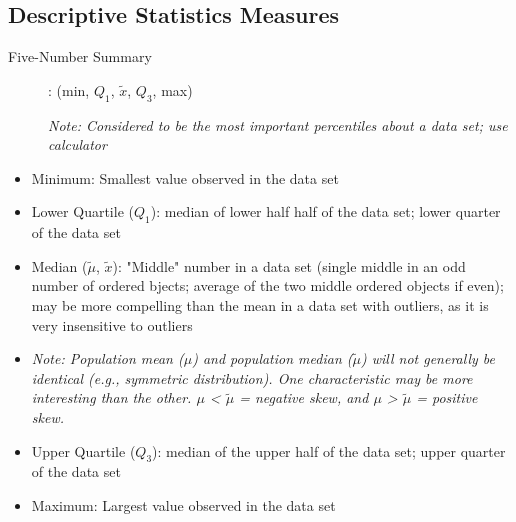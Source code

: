 \documentclass[12pt]{article}
\begin{document}
\subsection{Descriptive Statistics Measures}

    \begin{description}
        \item[Five-Number Summary]: (min, $Q_1$, $\tilde{x}$, $Q_3$, max)
        \item[] \textit{Note: Considered to be the most important percentiles about a data set; use calculator} 
    \end{description}
    \begin{itemize}
        \item Minimum: Smallest value observed in the data set
        \item Lower Quartile ($Q_1$): median of lower half half of the data set; lower quarter of the data set
        \item Median ($\tilde{\mu}$, $\tilde{x}$): "Middle" number in a data set (single middle in an odd number of ordered bjects; average of the two middle ordered objects if even); may be more compelling than the mean in a data set with outliers, as it is very insensitive to outliers
        \item[] \textit{Note: Population mean ($\mu$) and population median ($\tilde{\mu}$) will not generally be identical (e.g., symmetric distribution). One characteristic may be more interesting than the other. $\mu$ < $\tilde{\mu}$ = negative skew, and $\mu$ > $\tilde{\mu}$ = positive skew.} 
        \item Upper Quartile ($Q_3$): median of the upper half of the data set; upper quarter of the data set
        \item Maximum: Largest value observed in the data set
    \end{itemize}
\end{document}
